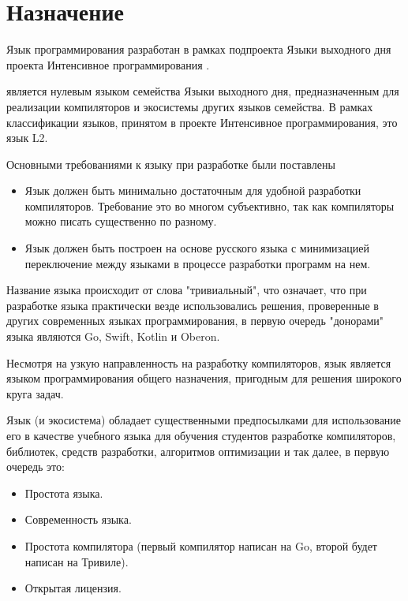 \hypertarget{назначение}{
\section{Назначение}\label{наз:назначение}}

Язык программирования \thelang{} разработан в рамках подпроекта Языки выходного дня  \needlink{} проекта Интенсивное программирования \needlink{}.

\thelang{} является нулевым языком семейства Языки выходного дня, предназначенным для реализации компиляторов и экосистемы других языков семейства. В рамках классификации языков, принятом в проекте Интенсивное программирования, это язык L2.

Основными требованиями к языку при разработке были поставлены
\begin{itemize}
\item 
    Язык должен быть минимально достаточным для удобной разработки компиляторов. Требование это во многом субъективно, так как компиляторы можно писать существенно по разному.
\item 
    Язык должен быть построен на основе русского языка с минимизацией переключение между языками в процессе разработки программ на нем.
\end{itemize}

Название языка происходит от слова "тривиальный", что означает, что при разработке языка практически везде использовались решения, проверенные в других современных языках программирования, в первую очередь "донорами" языка являются Go, Swift, Kotlin и Oberon.

Несмотря на узкую направленность на разработку компиляторов, \thelang{} язык является языком программирования общего назначения, пригодным для решения широкого круга задач.

Язык (и экосистема) обладает существенными предпосылками для использование его в качестве учебного языка для обучения студентов разработке компиляторов, библиотек, средств разработки, алгоритмов оптимизации и так далее, в первую очередь это:
\begin{itemize}
\item 
    Простота языка.
\item 
    Современность языка.
\item 
    Простота компилятора (первый компилятор написан на Go, второй будет написан на Тривиле).
\item 
    Открытая лицензия.
\end{itemize}

